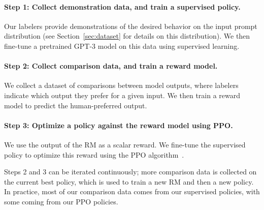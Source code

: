 \paragraph{Step 1: Collect demonstration data, and train a supervised policy.} Our labelers provide demonstrations of the desired behavior on the input prompt distribution (see Section~\ref{sec:dataset} for details on this distribution). We then fine-tune a pretrained GPT-3 model on this data using supervised learning.

\paragraph{Step 2: Collect comparison data, and train a reward model.} We collect a dataset of comparisons between model outputs, where labelers indicate which output they prefer for a given input. We then train a reward model to predict the human-preferred output.

\paragraph{Step 3: Optimize a policy against the reward model using PPO.} We use the output of the RM as a scalar reward. We fine-tune the supervised policy to optimize this reward using the PPO algorithm~\citep{schulman2017proximal}.

Steps 2 and 3 can be iterated continuously; more comparison data is collected on the current best policy, which is used to train a new RM and then a new policy. In practice, most of our comparison data comes from our supervised policies, with some coming from our PPO policies.


